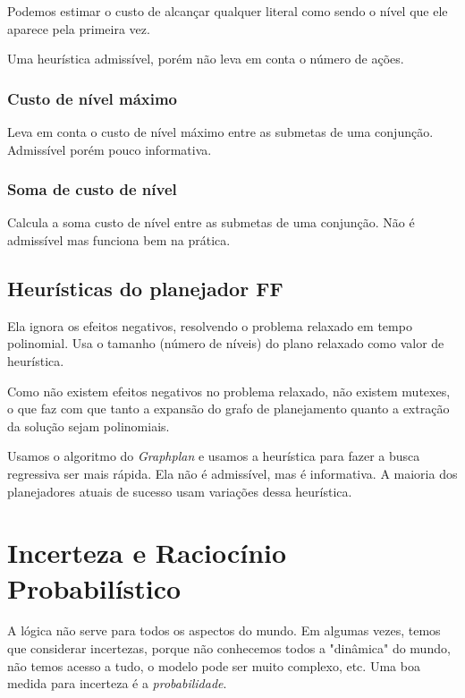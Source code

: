 \documentclass[12pt,letterpaper]{article}
\begin{document}
	Podemos estimar o custo de alcançar qualquer literal como sendo o nível que ele aparece pela primeira vez.
	
	Uma heurística admissível, porém não leva em conta o número de ações.
	
	\subsubsection*{Custo de nível máximo}
	
	Leva em conta o custo de nível máximo entre as submetas de uma conjunção. Admissível porém pouco informativa.
	
    \subsubsection*{Soma de custo de nível}
    
    Calcula a soma custo de nível entre as submetas de uma conjunção. Não é admissível mas funciona bem na prática.
    
    \subsection*{Heurísticas do planejador FF}
    
    Ela ignora os efeitos negativos, resolvendo o problema relaxado em tempo polinomial. Usa o tamanho (número de níveis) do plano relaxado como valor de heurística.
    
    Como não existem efeitos negativos no problema relaxado, não existem mutexes, o que faz com que tanto a expansão do grafo de planejamento quanto a extração da solução sejam polinomiais.
    
    Usamos o algoritmo do \textit{Graphplan} e usamos a heurística para fazer a busca regressiva ser mais rápida. Ela não é admissível, mas é informativa. A maioria dos planejadores atuais de sucesso usam variações dessa heurística.
	
	\section*{Incerteza e Raciocínio Probabilístico}
	
	A lógica não serve para todos os aspectos do mundo. Em algumas vezes, temos que considerar incertezas, porque não conhecemos todos a "dinâmica" do mundo, não temos acesso a tudo, o modelo pode ser muito complexo, etc. Uma boa medida para incerteza é a \textit{probabilidade}.
	
\end{document}

